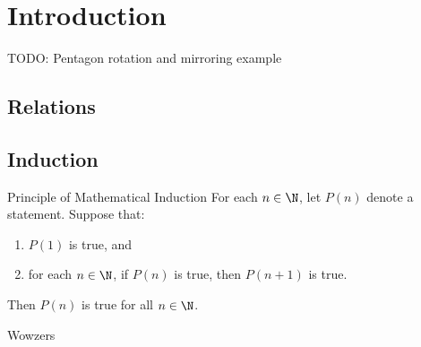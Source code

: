 \chapter{Introduction}

TODO: Pentagon rotation and mirroring example

\section{Relations}

\section{Induction}

\begin{thmbox}{Principle of Mathematical Induction}{}
    For each $n \in \N$, let $P(n)$ denote a statement. Suppose that:
    \begin{enumerate}
        \item $P(1)$ is true, and
        \item for each $n \in \N$, if $P(n)$ is true, then $P(n+1)$ is true.
    \end{enumerate}
    Then $P(n)$ is true for all $n \in \N$.
\end{thmbox}

Wowzers
